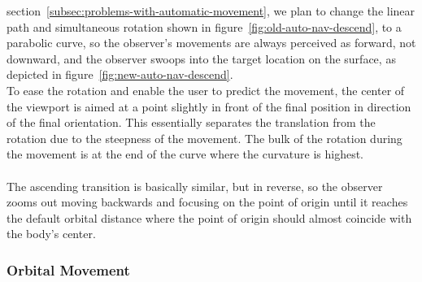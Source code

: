section~\ref{subsec:problems-with-automatic-movement}, we plan to change the linear path and simultaneous rotation
shown in figure~\ref{fig:old-auto-nav-descend}, to a parabolic curve, so the observer's movements are always
perceived as forward, not downward, and the observer swoops into the target location on the surface, as depicted in
figure~\ref{fig:new-auto-nav-descend}.
\\
To ease the rotation and enable the user to predict the movement, the center of the viewport is aimed at a point
slightly in front of the final position in direction of the final orientation.
This essentially separates the translation from the rotation due to the steepness of the movement.
The bulk of the rotation during the movement is at the end of the curve where the curvature is highest.
\\
\\
The ascending transition is basically similar, but in reverse, so the observer zooms out moving backwards and
focusing on the point of origin until it reaches the default orbital distance where the point of origin should almost
coincide with the body's center.

\subsubsection{Orbital Movement}\label{subsubsec:orbital-movements}

